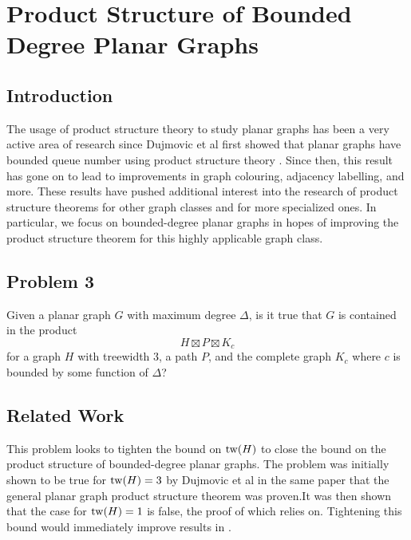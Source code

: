 \documentclass[../main.tex]{subfiles}
\begin{document}
	
	\section{Product Structure of Bounded Degree Planar Graphs}
	\subsection{Introduction}
	The usage of product structure theory to study planar graphs has been a very active area of research since Dujmovic et al first showed that planar graphs have bounded queue number using product structure theory \cite{DJMMUW20}. Since then, this result has gone on to lead to improvements in graph colouring\cite{}, adjacency labelling\cite{}, and more. These results have pushed additional interest into the research of product structure theorems for other graph classes and for more specialized ones. In particular, we focus on bounded-degree planar graphs in hopes of improving the product structure theorem for this highly applicable graph class.  
	\subsection{Problem 3}
	Given a planar graph $G$ with maximum degree $\Delta$, is it true that $G$ is contained in the product $$H\boxtimes P\boxtimes K_c$$ for a graph $H$ with treewidth 3, a path $P$, and the complete graph $K_c$ where $c$ is bounded by some function of $\Delta$?
	
	\subsection{Related Work}
	This problem looks to tighten the bound on $\operatorname{tw}(H)$ to close the bound on the product structure of bounded-degree planar graphs. The problem was initially shown to be true for $\operatorname{tw}(H)=3$ by Dujmovic et al in the same paper that the general planar graph product structure theorem was proven\cite{DJMMUW20}.It was then shown that the case for $\operatorname{tw}(H)=1$ is false\cite{todo}, the proof of which relies on. Tightening this bound would immediately improve results in \cite{}.
	
	
	
	
\end{document}
